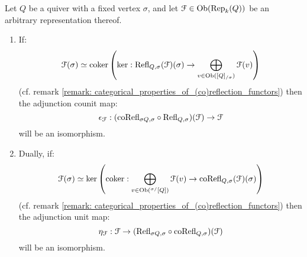             \begin{lemma} \label{lemma: fixed_points_of_(co)reflection_adjunctions}
                Let $Q$ be a quiver with a fixed vertex $\sigma$, and let $\mathcal{F} \in \mathrm{Ob}(\mathrm{Rep}_k(Q))$ be an arbitrary representation thereof.
                    \begin{enumerate}
                        \item If:
                            $$\mathcal{F}(\sigma) \simeq \operatorname{coker} \left( \ker: \mathrm{Refl}_{Q, \sigma}(\mathcal{F})(\sigma) \to \bigoplus_{v \in \mathrm{Ob}([Q]_{/\sigma})} \mathcal{F}(v) \right)$$
                        (cf. remark \ref{remark: categorical_properties_of_(co)reflection_functors}) then the adjunction counit map:
                            $$\epsilon_{\mathcal{F}}: (\mathrm{co}\mathrm{Refl}_{\sigma Q, \sigma} \circ \mathrm{Refl}_{Q, \sigma})(\mathcal{F}) \to \mathcal{F}$$
                        will be an isomorphism.
                        \item Dually, if:
                            $$\mathcal{F}(\sigma) \simeq \ker \left( \operatorname{coker}: \bigoplus_{v \in \mathrm{Ob}({}^{\sigma/}[Q])} \mathcal{F}(v) \to \mathrm{co}\mathrm{Refl}_{Q, \sigma}(\mathcal{F})(\sigma) \right)$$
                        (cf. remark \ref{remark: categorical_properties_of_(co)reflection_functors}) then the adjunction unit map:
                            $$\eta_{\mathcal{F}}: \mathcal{F} \to (\mathrm{Refl}_{\sigma Q, \sigma} \circ \mathrm{co}\mathrm{Refl}_{Q, \sigma})(\mathcal{F})$$
                        will be an isomorphism.
                    \end{enumerate}
            \end{lemma}
